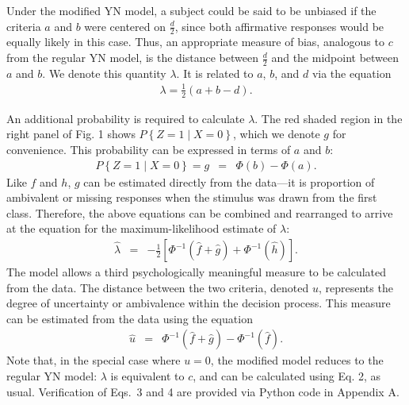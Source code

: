 \documentclass[man]{apa6}
\begin{document}
Under the modified YN model, a subject could be said to be unbiased if the criteria $a$ and $b$ were centered on $\frac{d}{2}$, since both affirmative responses would be equally likely in this case. Thus, an appropriate measure of bias, analogous to $c$ from the regular YN model, is the distance between $\frac{d}{2}$ and the midpoint between $a$ and $b$. We denote this quantity $\lambda$. It is related to $a$, $b$, and $d$ via the equation
\begin{eqnarray*}\lambda=\frac{1}{2}\left(a+b-d\right)\textrm{.}\end{eqnarray*}

An additional probability is required to calculate $\lambda$. The red shaded region in the right panel of Fig. 1 shows $P\left\{Z=1\mid{}X=0\right\}$, which we denote $g$ for convenience. This probability can be expressed in terms of $a$ and $b$:
\begin{eqnarray*}
P\left\{Z=1\mid{}X=0\right\}=g&=&\Phi\left(b\right)-\Phi\left(a\right)\textrm{.}
\end{eqnarray*}
Like $f$ and $h$, $g$ can be estimated directly from the data---it is proportion of ambivalent or missing responses when the stimulus was drawn from the first class. Therefore, the above equations can be combined and rearranged to arrive at the equation for the maximum-likelihood estimate of $\lambda$:
\begin{eqnarray}
\hat{\lambda}&=&-\frac{1}{2}\left[\Phi^{-1}\left(\hat{f}+\hat{g}\right)+\Phi^{-1}\left(\hat{h}\right)\right]\textrm{.}
\end{eqnarray}The model allows a third psychologically meaningful measure to be calculated from the data. The distance between the two criteria, denoted $u$, represents the degree of uncertainty or ambivalence within the decision process. This measure can be estimated from the data using the equation
\begin{eqnarray}
\hat{u}&=&\Phi^{-1}\left(\hat{f}+\hat{g}\right)-\Phi^{-1}\left(\hat{f}\right)\textrm{.}
\end{eqnarray}Note that, in the special case where $u=0$, the modified model reduces to the regular YN model: $\lambda$ is equivalent to $c$, and can be calculated using Eq. 2, as usual. Verification of Eqs.~3 and 4 are provided via Python code in Appendix A.
\end{document}

